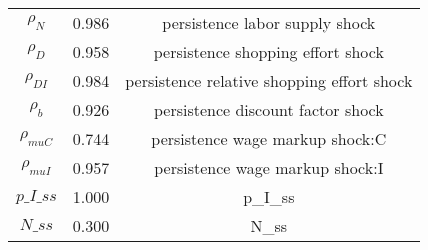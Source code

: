 \begin{center}
\begin{longtable}{ccc}
${\rho_N}$ 	 & 	 0.986 	 & 	 persistence labor supply shock\\
${\rho_D}$ 	 & 	 0.958 	 & 	 persistence shopping effort shock\\
${\rho_{DI}}$ 	 & 	 0.984 	 & 	 persistence relative shopping effort shock\\
${\rho_b}$ 	 & 	 0.926 	 & 	 persistence discount factor shock\\
${\rho_{muC}}$ 	 & 	 0.744 	 & 	 persistence wage markup shock:C\\
${\rho_{muI}}$ 	 & 	 0.957 	 & 	 persistence wage markup shock:I\\
$p\_I\_ss$ 	 & 	 1.000 	 & 	 p\_I\_ss\\
$N\_ss$ 	 & 	 0.300 	 & 	 N\_ss\\
\bottomrule%
\end{longtable}
\end{center}
